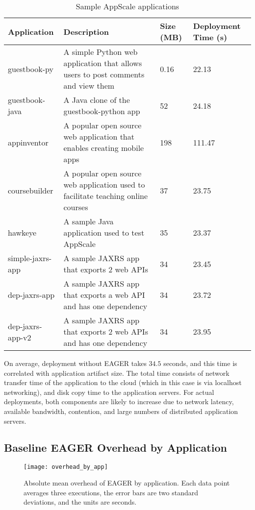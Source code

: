 \begin{table}[t]
\begin{center}
\begin{tabular}{| p{3cm} | p{6.5cm} | p{1cm} | p{2.2cm} | }
\hline
Application & Description & Size (MB) & Deployment Time (s) \\ \hline
guestbook-py & A simple Python web application that allows users to post
comments and view them & 0.16 & 22.13 \\ \hline
guestbook-java & A Java clone of the guestbook-python app & 52 & 24.18 \\ \hline
appinventor & A popular open source web application that enables creating mobile apps & 198 & 111.47 \\ \hline
coursebuilder & A popular open source web application used to facilitate teaching online courses & 37 & 23.75 \\ \hline
hawkeye & A sample Java application used to test AppScale & 35 & 23.37 \\ \hline
simple-jaxrs-app & A sample JAXRS app that exports 2 web APIs & 34 & 23.45 \\ \hline
dep-jaxrs-app & A sample JAXRS app that exports a web API and has one dependency & 34 & 23.72 \\ \hline
dep-jaxrs-app-v2 & A sample JAXRS app that exports 2 web APIs and has one dependency & 34 & 23.95 \\ \hline
\end{tabular}
\end{center}
\caption{Sample AppScale applications}
\label{tab:sample_apps}
\end{table}

On average, deployment without EAGER takes $34.5$ seconds, and this time 
is correlated with application artifact size.  The total time consists
of network transfer time of the application to the cloud (which in this 
case is via localhost networking), and disk copy time to the application servers.
For actual deployments, both components are likely to increase due to network
latency, available bandwidth, contention, and large numbers of distributed
application servers.

\subsection{Baseline EAGER Overhead by Application}

\begin{figure*}
\centering
\texttt{[image: overhead\_by\_app]}
\caption{Absolute mean overhead of EAGER by application.  Each
data point averages three executions, the error
bars are two standard deviations, and the units are seconds.}
\label{fig:overhead_by_app}
\end{figure*}

